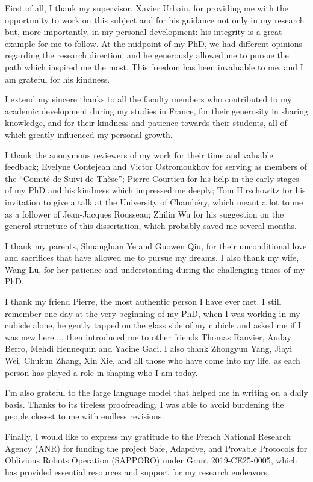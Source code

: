 

First of all, I thank my supervisor, Xavier Urbain, for providing me with the opportunity to work on this subject and for his guidance not only in my research but, more importantly, in my personal development: his integrity is a great example for me to follow. At the midpoint of my PhD, we had different opinions regarding the research direction, and he generously allowed me to pursue the path which inspired me the most. This freedom has been invaluable to me, and I am grateful for his kindness.

I extend my sincere thanks to all the faculty members who contributed to my academic development during my studies in France, for their generosity in sharing knowledge, and for their kindness and patience towards their students, all of which greatly influenced my personal growth.

I thank the anonymous reviewers of my work for their time and valuable feedback; Evelyne Contejean and Victor Ostromoukhov for serving as members of the \enquote{Comité de Suivi de Thèse}; Pierre Courtieu for his help in the early stages of my PhD and his kindness which impressed me deeply; Tom Hirschowitz for his invitation to give a talk at the University of Chambéry, which meant a lot to me as a follower of Jean-Jacques Rousseau; Zhilin Wu for his suggestion on the general structure of this dissertation, which probably saved me several months.

I thank my parents, Shuangluan Ye and Guowen Qiu, for their unconditional love and sacrifices that have allowed me to pursue my dreams. I also thank my wife, Wang Lu, for her patience and understanding during the challenging times of my PhD.

I thank my friend Pierre, the most authentic person I have ever met. I still remember one day at the very beginning of my PhD, when I was working in my cubicle alone, he gently tapped on the glass side of my cubicle and asked me if I was new here ... then introduced me to other friends Thomas Ranvier, Auday Berro, Mehdi Hennequin and Yacine Gaci. I also thank Zhongyun Yang, Jiayi Wei, Chukun Zhang, Xin Xie, and all those who have come into my life, as each person has played a role in shaping who I am today.

I'm also grateful to the large language model that helped me in writing on a daily basis. Thanks to its tireless proofreading, I was able to avoid burdening the people closest to me with endless revisions.

Finally, I would like to express my gratitude to the French National Research Agency (ANR) for funding the project Safe, Adaptive, and Provable Protocols for Oblivious Robots Operation (SAPPORO) under Grant 2019-CE25-0005, which has provided essential resources and support for my research endeavors.  
